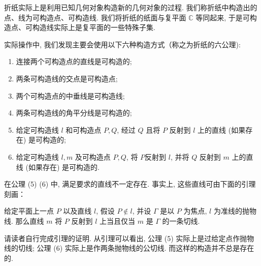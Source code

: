 折纸实际上是利用已知几何对象构造新的几何对象的过程.
 我们称折纸中构造出的点、线为可构造点、可构造线. 
 我们将折纸的纸面与复平面 $\mathbb{C}$ 等同起来, 
 于是可构造点、可构造线实际上是复平面的一些特殊子集. 

实际操作中, 我们发现主要会使用以下六种构造方式（称之为折纸的六公理): 

\begin{enumerate}[wide,itemindent=2em,label=(\arabic*)]
    \item 连接两个可构造点的直线是可构造的; 
    \item 两条可构造线的交点是可构造点; 
    \item 两个可构造点的中垂线是可构造线; 
    \item 两条可构造线的角平分线是可构造的; 
    \item 给定可构造线 $l$ 和可构造点 $P,Q$, 
    经过 $Q$ 且将 $P$ 反射到 $l$ 上的直线 (如果存在) 是可构造的; 
    \item 给定可构造线 $l,m$ 及可构造点 $P,Q$, 
    将 $P$反射到 $l$, 并将 $Q$ 反射到 $m$ 上的直线 (如果存在) 是可构造的. 
\end{enumerate}

在公理 (5) (6) 中, 满足要求的直线不一定存在. 事实上, 这些直线可由下面的引理刻画：

\begin{lemma}
    给定平面上一点 $P$ 以及直线 $l$, 假设 $P \notin l$, 
    并设 $\Gamma$ 是以 $P$ 为焦点, $l$ 为准线的抛物线. 
    那么直线 $m$ 将 $P$ 反射到 $l$ 上当且仅当 $m$ 是 $\Gamma$ 的一条切线. 
\end{lemma}

请读者自行完成引理的证明. 从引理可以看出, 公理 (5) 实际上是过给定点作抛物线的切线; 
公理 (6) 实际上是作两条抛物线的公切线. 而这样的构造并不总是存在的. 